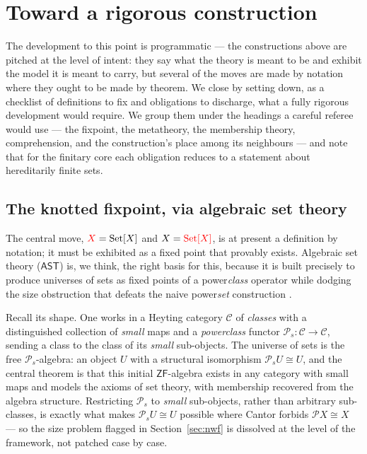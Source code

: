 
\section{Toward a rigorous construction}
\label{sec:rigor}

The development to this point is programmatic --- the constructions above are
pitched at the level of intent: they say what the theory is meant to be and exhibit the model it is meant to
carry, but several of the moves are made by notation where they ought to be made
by theorem. We close by setting down, as a checklist of definitions to fix and
obligations to discharge, what a fully rigorous development would require. We
group them under the headings a careful referee would use --- the fixpoint, the
metatheory, the membership theory, comprehension, and the construction's place
among its neighbours --- and note that for the finitary core each obligation
reduces to a statement about hereditarily finite sets.

\subsection{The knotted fixpoint, via algebraic set theory}
\label{sec:rigor:fixpoint}

The central move, $\textcolor{red}{X} = \textcolor{black}{\mathrm{Set}[X]}$ and $\textcolor{black}{X} = \textcolor{red}{\mathrm{Set}[X]}$, is at present a definition by
notation; it must be exhibited as a fixed point that provably exists. Algebraic
set theory ($\mathsf{AST}$) is, we think, the right basis for this, because it is
built precisely to produce universes of sets as fixed points of a
power\emph{class} operator while dodging the size obstruction that defeats the
naive power\emph{set} construction \cite{joyal1995algebraic,awodey2008ast}.

Recall its shape. One works in a Heyting category $\mathcal{C}$ of \emph{classes}
with a distinguished collection of \emph{small} maps and a \emph{powerclass}
functor $\mathcal{P}_s\colon\mathcal{C}\to\mathcal{C}$, sending a class to the
class of its \emph{small} sub-objects. The universe of sets is the free
$\mathcal{P}_s$-algebra: an object $U$ with a structural isomorphism
$\mathcal{P}_s U\cong U$, and the central theorem is that this initial
$\mathsf{ZF}$-algebra exists in any category with small maps and models the axioms
of set theory, with membership recovered from the algebra structure. Restricting
$\mathcal{P}_s$ to \emph{small} sub-objects, rather than arbitrary sub-classes, is
exactly what makes $\mathcal{P}_s U\cong U$ possible where Cantor forbids
$\mathcal{P}X\cong X$ --- so the size problem flagged in Section~\ref{sec:nwf} is
dissolved at the level of the framework, not patched case by case.

